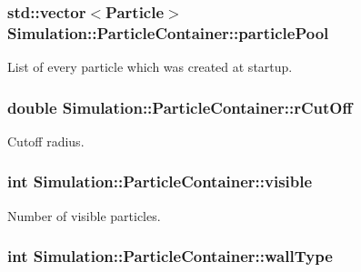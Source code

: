 \hypertarget{classSimulation_1_1ParticleContainer_a45869e923d4b355d3be609ec78235bf0}{
\subsubsection[{particle\-Pool}]{\setlength{\rightskip}{0pt plus 5cm}std\-::vector$<${\bf Particle}$>$ Simulation\-::\-Particle\-Container\-::particle\-Pool\hspace{0.3cm}{\ttfamily [private]}}}\label{classSimulation_1_1ParticleContainer_a45869e923d4b355d3be609ec78235bf0}


List of every particle which was created at startup. 

\hypertarget{classSimulation_1_1ParticleContainer_a1f0e9467546c765bf8533a307b5587e1}{
\subsubsection[{r\-Cut\-Off}]{\setlength{\rightskip}{0pt plus 5cm}double Simulation\-::\-Particle\-Container\-::r\-Cut\-Off\hspace{0.3cm}{\ttfamily [private]}}}\label{classSimulation_1_1ParticleContainer_a1f0e9467546c765bf8533a307b5587e1}


Cutoff radius. 

\hypertarget{classSimulation_1_1ParticleContainer_a3e3805eea543d96c5cf6ced07b9c2e7b}{
\subsubsection[{visible}]{\setlength{\rightskip}{0pt plus 5cm}int Simulation\-::\-Particle\-Container\-::visible\hspace{0.3cm}{\ttfamily [private]}}}\label{classSimulation_1_1ParticleContainer_a3e3805eea543d96c5cf6ced07b9c2e7b}


Number of visible particles. 

\hypertarget{classSimulation_1_1ParticleContainer_a257c23a232693610d47c0ee082085a49}{
\subsubsection[{wall\-Type}]{\setlength{\rightskip}{0pt plus 5cm}int Simulation\-::\-Particle\-Container\-::wall\-Type\hspace{0.3cm}{\ttfamily [private]}}}\label{classSimulation_1_1ParticleContainer_a257c23a232693610d47c0ee082085a49}


